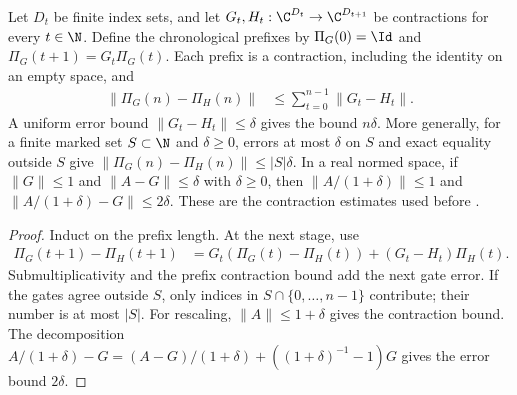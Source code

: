 \begin{theorem}
    \label{thm:reduction_chain}
    \leanok
    Let $D_t$ be finite index sets, and let
    $G_t,H_t:\C^{D_t}\to\C^{D_{t+1}}$ be contractions for every
    $t\in\N$. Define the chronological prefixes by
    $\Pi_G(0)=\Id$ and $\Pi_G(t+1)=G_t\Pi_G(t)$.
    Each prefix is a contraction, including the identity on an empty
    space, and
    \begin{align}
        \lVert\Pi_G(n)-\Pi_H(n)\rVert
         & \leq\sum_{t=0}^{n-1}\lVert G_t-H_t\rVert.
        \label{eq:reduction_telescoping}
    \end{align}
    A uniform error bound $\lVert G_t-H_t\rVert\leq\delta$ gives the
    bound $n\delta$. More generally, for a finite marked set $S\subset\N$
    and $\delta\geq0$, errors at most $\delta$ on $S$ and exact equality
    outside $S$ give $\lVert\Pi_G(n)-\Pi_H(n)\rVert\leq|S|\delta$.
    In a real normed space, if $\lVert G\rVert\leq1$ and
    $\lVert A-G\rVert\leq\delta$ with $\delta\geq0$, then
    $\lVert A/(1+\delta)\rVert\leq1$ and
    $\lVert A/(1+\delta)-G\rVert\leq2\delta$.
    These are the contraction estimates used before
    \cite[Equation~(5.3)]{OpenAI2026PolynomialPEPS}.
\end{theorem}

\begin{proof}\leanok
    Induct on the prefix length. At the next stage, use
    \begin{align}
        \Pi_G(t+1)-\Pi_H(t+1)
         & =G_t(\Pi_G(t)-\Pi_H(t))+(G_t-H_t)\Pi_H(t).
        \label{eq:reduction_telescoping_step}
    \end{align}
    Submultiplicativity and the prefix contraction bound add the next
    gate error. If the gates agree outside $S$, only indices in
    $S\cap\{0,\ldots,n-1\}$ contribute; their number is at most $|S|$.
    For rescaling, $\lVert A\rVert\leq1+\delta$ gives the contraction
    bound. The decomposition
    $A/(1+\delta)-G=(A-G)/(1+\delta)
        +((1+\delta)^{-1}-1)G$ gives the error bound $2\delta$.
\end{proof}

